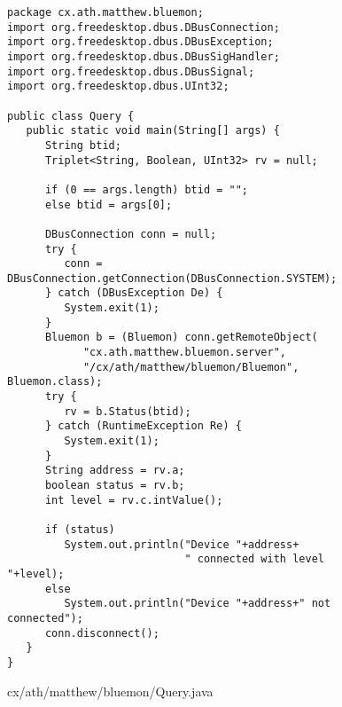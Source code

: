 \documentclass[a4paper,12pt]{article}
\begin{document}
\begin{figure}[!h]
\begin{center}
\begin{verbatim}
package cx.ath.matthew.bluemon;
import org.freedesktop.dbus.DBusConnection;
import org.freedesktop.dbus.DBusException;
import org.freedesktop.dbus.DBusSigHandler;
import org.freedesktop.dbus.DBusSignal;
import org.freedesktop.dbus.UInt32;

public class Query {
   public static void main(String[] args) {
      String btid;
      Triplet<String, Boolean, UInt32> rv = null;
      
      if (0 == args.length) btid = "";
      else btid = args[0];
      
      DBusConnection conn = null;
      try {
         conn = DBusConnection.getConnection(DBusConnection.SYSTEM);
      } catch (DBusException De) {
         System.exit(1);
      }     
      Bluemon b = (Bluemon) conn.getRemoteObject(
            "cx.ath.matthew.bluemon.server", 
            "/cx/ath/matthew/bluemon/Bluemon", Bluemon.class);
      try {
         rv = b.Status(btid);
      } catch (RuntimeException Re) {
         System.exit(1);
      }
      String address = rv.a;
      boolean status = rv.b;
      int level = rv.c.intValue();

      if (status)
         System.out.println("Device "+address+
                            " connected with level "+level);
      else
         System.out.println("Device "+address+" not connected");
      conn.disconnect();
   }
}
\end{verbatim}
\end{center}
\caption{cx/ath/matthew/bluemon/Query.java}
\end{figure}

\newpage
\end{document}
